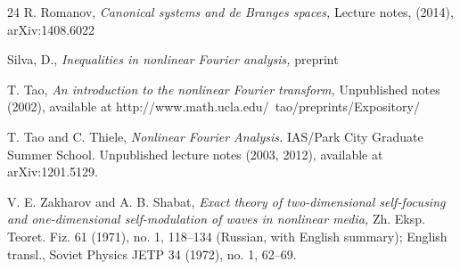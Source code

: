 \documentclass[11pt,twoside,reqno]{amsart}
\theoremstyle{plain}
\numberwithin{equation}{section}
\begin{document}
\begin{thebibliography}{24}
 {\sc R. Romanov,} {\it Canonical systems and de Branges spaces,} Lecture notes, (2014), arXiv:1408.6022

 {\sc Silva, D.,} {\it Inequalities in nonlinear Fourier analysis,} preprint


 {\sc T. Tao,} {\it An introduction to the nonlinear Fourier transform,} Unpublished notes (2002), available at
http://www.math.ucla.edu/~tao/preprints/Expository/

 {\sc T. Tao and C. Thiele,} {\it Nonlinear Fourier Analysis.} IAS/Park City Graduate Summer School. Unpublished
lecture notes (2003, 2012), available at arXiv:1201.5129.


 {\sc V. E. Zakharov and A. B. Shabat,} {\it Exact theory of two-dimensional self-focusing and one-dimensional self-modulation of waves in nonlinear media,} Zh. Eksp. Teoret. Fiz. 61 (1971), no. 1, 118--134 (Russian, with English summary); English transl., Soviet Physics JETP 34 (1972), no. 1, 62--69.



\end{thebibliography}
\end{document}
